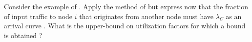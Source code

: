 \begin{problem}
Consider the example of . Apply the method of
 but express now that the fraction of
input traffic to node $i$ that originates from another node must
have $\lambda_C$ as an arrival curve . What is the upper-bound on
utilization factors for which a bound is obtained ?
\end{problem}
